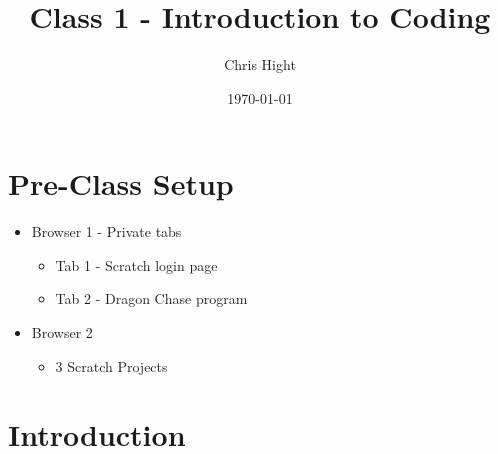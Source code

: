 \documentclass[12pt]{article}
\title{Class 1 - Introduction to Coding}
\author{Chris Hight}
\date{\today}
\begin{document}
\maketitle

\section*{Pre-Class Setup}
	\begin{itemize}
		
		\item Browser 1 - Private tabs
		\begin{itemize}
			\item Tab 1 - Scratch login page
			\item Tab 2 - Dragon Chase program
		\end{itemize}
		
		\item Browser 2
		\begin{itemize}
			\item 3 Scratch Projects
		\end{itemize} 
		
	\end{itemize}




\section*{Introduction}
\end{document}
